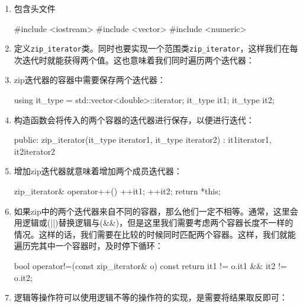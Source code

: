 \begin{enumerate}
\item 包含头文件

\begin{codebox}[cpp]
#include <iostream>
#include <vector>
#include <numeric>
\end{codebox}

\item 定义\texttt{zip\_iterator}类。同时也要实现一个范围类\texttt{zip\_iterator}，这样我们在每次迭代时就能获得两个值。这也意味着我们同时遍历两个迭代器：

\begin{codebox}[cpp]
class zip_iterator {
\end{codebox}

\item zip迭代器的容器中需要保存两个迭代器：

\begin{codebox}[cpp]
    using it_type = std::vector<double>::iterator;
    it_type it1;
    it_type it2;
\end{codebox}

\item 构造函数会将传入的两个容器的迭代器进行保存，以便进行迭代：

\begin{codebox}[cpp]
public:
    zip_iterator(it_type iterator1, it_type iterator2)
        : it1{iterator1}, it2{iterator2}
    {}
\end{codebox}

\item 增加zip迭代器就意味着增加两个成员迭代器：

\begin{codebox}[cpp]
zip_iterator& operator++() {
    ++it1;
    ++it2;
    return *this;
}
\end{codebox}

\item 如果zip中的两个迭代器来自不同的容器，那么他们一定不相等。通常，这里会用逻辑或(||)替换逻辑与(\&\&)，但是这里我们需要考虑两个容器长度不一样的情况。这样的话，我们需要在比较的时候同时匹配两个容器。这样，我们就能遍历完其中一个容器时，及时停下循环：

\begin{codebox}[cpp]
    bool operator!=(const zip_iterator& o) const {
        return it1 != o.it1 && it2 != o.it2;
    }
\end{codebox}

\item 逻辑等操作符可以使用逻辑不等的操作符的实现，是需要将结果取反即可：


\end{enumerate}
